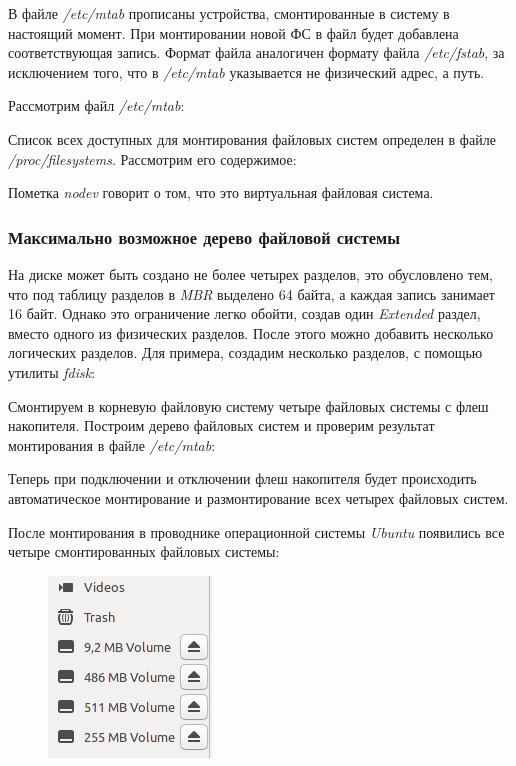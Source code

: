 \documentclass[14pt,a4paper,report]{report}
\begin{document}
В файле \emph{/etc/mtab} прописаны устройства, смонтированные в систему в настоящий момент. При монтировании новой ФС в файл будет добавлена соответствующая запись. Формат файла аналогичен формату файла \emph{/etc/fstab}, за исключением того, что в \emph{/etc/mtab} указывается не физический адрес, а путь.

Рассмотрим файл \emph{/etc/mtab}:



Список всех доступных для монтирования файловых систем определен в файле \emph{/proc/filesystems}. Рассмотрим его содержимое:



Пометка \emph{nodev} говорит о том, что это виртуальная файловая система.

\subsubsection{Максимально возможное дерево файловой системы}

На диске может быть создано не более четырех разделов, это обусловлено тем, что под таблицу разделов в \emph{MBR} выделено 64 байта, а каждая запись занимает 16 байт. Однако это ограничение легко обойти, создав один \emph{Extended} раздел, вместо одного из физических разделов. После этого можно добавить несколько логических разделов. Для примера, создадим несколько разделов, с помощью утилиты \emph{fdisk}:



Смонтируем в корневую файловую систему четыре файловых системы с флеш накопителя. Построим дерево файловых систем и проверим результат монтирования в файле \emph{/etc/mtab}:



Теперь при подключении и отключении флеш накопителя будет происходить автоматическое монтирование и размонтирование всех четырех файловых систем.

\clearpage

После монтирования в проводнике операционной системы \emph{Ubuntu} появились все четыре смонтированных файловых системы:

\begin{figure}[h!]
	\centering
	\includegraphics[scale = 0.85]{images/11.png}
	
	\caption{}
	\label{image:1}
\end{figure}
\end{document}

